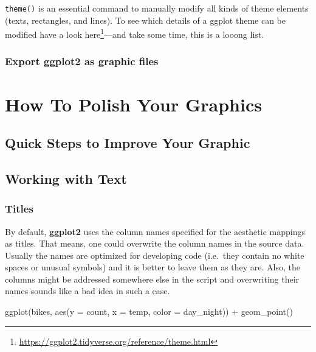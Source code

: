\documentclass[
]{krantz}
\makeatletter
\newenvironment{Shaded}{\begin{snugshade}}{\end{snugshade}}
\newcommand{\AttributeTok}[1]{\textcolor[rgb]{0.61,0.61,0.61}{#1}}
\newcommand{\FunctionTok}[1]{\textcolor[rgb]{0,0,0}{#1}}
\newcommand{\NormalTok}[1]{#1}
\newcommand{\SpecialCharTok}[1]{\textcolor[rgb]{0,0,0}{#1}}
\renewcommand{\href}[2]{#2\footnote{\url{#1}}}
\newenvironment{kframe}{%
\medskip{}
\setlength{\fboxsep}{.8em}
 \def\at@end@of@kframe{}%
 \ifinner\ifhmode%
  \def\at@end@of@kframe{\end{minipage}}%
  \begin{minipage}{\columnwidth}%
 \fi\fi%
 \def\FrameCommand##1{\hskip\@totalleftmargin \hskip-\fboxsep
 \colorbox{shadecolor}{##1}\hskip-\fboxsep
     \hskip-\linewidth \hskip-\@totalleftmargin \hskip\columnwidth}%
 \MakeFramed {\advance\hsize-\width
   \@totalleftmargin\z@ \linewidth\hsize
   \@setminipage}}%
 {\par\unskip\endMakeFramed%
 \at@end@of@kframe}
\renewenvironment{Shaded}{\begin{kframe}}{\end{kframe}}
\makeatother
\begin{document}
\texttt{theme()} is an essential command to manually modify all kinds of theme elements (texts, rectangles, and lines). To see which details of a ggplot theme can be modified have a look \href{https://ggplot2.tidyverse.org/reference/theme.html}{here}---and take some time, this is a looong list.

\hypertarget{export}{%
\section{\texorpdfstring{Export \textbf{ggplot2} as graphic files}{Export ggplot2 as graphic files}}\label{export}}

\hypertarget{part-how-to-polish-your-graphics}{%
\part{How To Polish Your Graphics}\label{part-how-to-polish-your-graphics}}

\hypertarget{polish}{%
\chapter{Quick Steps to Improve Your Graphic}\label{polish}}

\hypertarget{text}{%
\chapter{Working with Text}\label{text}}

\hypertarget{titles}{%
\section{Titles}\label{titles}}

By default, \textbf{ggplot2} uses the column names specified for the aesthetic mappings as titles. That means, one could overwrite the column names in the source data. Usually the names are optimized for developing code (i.e.~they contain no white spaces or unusual symbols) and it is better to leave them as they are. Also, the columns might be addressed somewhere else in the script and overwriting their names sounds like a bad idea in such a case.

\begin{Shaded}
\begin{Highlighting}[]
\FunctionTok{ggplot}\NormalTok{(bikes, }\FunctionTok{aes}\NormalTok{(}\AttributeTok{y =}\NormalTok{ count, }\AttributeTok{x =}\NormalTok{ temp, }\AttributeTok{color =}\NormalTok{ day\_night)) }\SpecialCharTok{+} 
  \FunctionTok{geom\_point}\NormalTok{()}
\end{Highlighting}
\end{Shaded}
\end{document}
